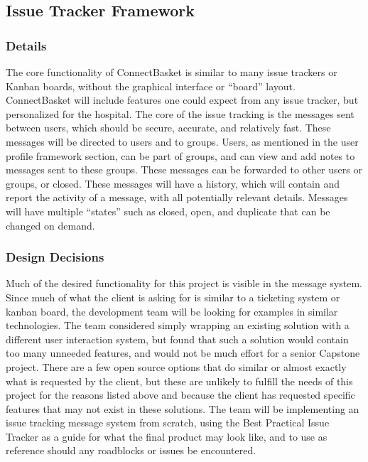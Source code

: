 \documentclass[onecolumn, draftclsnofoot,10pt, compsoc]{IEEEtran}
\begin{document}
\subsection{Issue Tracker Framework}

\subsubsection{Details}
The core functionality of ConnectBasket is similar to many issue trackers or Kanban boards, without the graphical interface or “board” layout. ConnectBasket will include features one could expect from any issue tracker, but personalized for the hospital. The core of the issue tracking is the messages sent between users, which should be secure, accurate, and relatively fast. These messages will be directed to users and to groups. Users, as mentioned in the user profile framework section, can be part of groups, and can view and add notes to messages sent to these groups. These messages can be forwarded to other users or groups, or closed. These messages will have a history, which will contain and report the activity of a message, with all potentially relevant details. Messages will have multiple “states” such as closed, open, and duplicate that can be changed on demand.


\subsubsection{Design Decisions}
Much of the desired functionality for this project is visible in the message system. Since much of what the client is asking for is similar to a ticketing system or kanban board, the development team will be looking for examples in similar technologies. The team considered simply wrapping an existing solution with a different user interaction system, but found that such a solution would contain too many unneeded features, and would not be much effort for a senior Capstone project. There are a few open source options that do similar or almost exactly what is requested by the client, but these are unlikely to fulfill the needs of this project for the reasons listed above and because the client has requested specific features that may not exist in these solutions. The team will be implementing an issue tracking message system from scratch, using the Best Practical Issue Tracker as a guide for what the final product may look like, and to use as reference should any roadblocks or issues be encountered.
\end{document}
